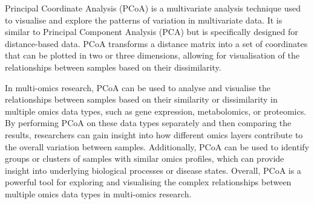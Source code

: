 \documentclass[
]{book}
\newenvironment{Shaded}{\begin{snugshade}}{\end{snugshade}}
\newcommand{\AttributeTok}[1]{\textcolor[rgb]{0.77,0.63,0.00}{#1}}
\newcommand{\CommentTok}[1]{\textcolor[rgb]{0.56,0.35,0.01}{\textit{#1}}}
\newcommand{\ConstantTok}[1]{\textcolor[rgb]{0.00,0.00,0.00}{#1}}
\newcommand{\DecValTok}[1]{\textcolor[rgb]{0.00,0.00,0.81}{#1}}
\newcommand{\FunctionTok}[1]{\textcolor[rgb]{0.00,0.00,0.00}{#1}}
\newcommand{\NormalTok}[1]{#1}
\newcommand{\OtherTok}[1]{\textcolor[rgb]{0.56,0.35,0.01}{#1}}
\newcommand{\SpecialCharTok}[1]{\textcolor[rgb]{0.00,0.00,0.00}{#1}}
\newcommand{\StringTok}[1]{\textcolor[rgb]{0.31,0.60,0.02}{#1}}
\begin{document}
Principal Coordinate Analysis (PCoA) is a multivariate analysis technique used to visualise and explore the patterns of variation in multivariate data. It is similar to Principal Component Analysis (PCA) but is specifically designed for distance-based data. PCoA transforms a distance matrix into a set of coordinates that can be plotted in two or three dimensions, allowing for visualisation of the relationships between samples based on their dissimilarity.

In multi-omics research, PCoA can be used to analyse and visualise the relationships between samples based on their similarity or dissimilarity in multiple omics data types, such as gene expression, metabolomics, or proteomics. By performing PCoA on these data types separately and then comparing the results, researchers can gain insight into how different omics layers contribute to the overall variation between samples. Additionally, PCoA can be used to identify groups or clusters of samples with similar omics profiles, which can provide insight into underlying biological processes or disease states. Overall, PCoA is a powerful tool for exploring and visualising the complex relationships between multiple omics data types in multi-omics research.

\small

\begin{Shaded}
\end{Shaded}
\end{document}
